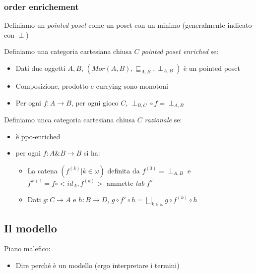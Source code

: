 \documentclass{beamer}
\begin{document}
\begin{frame}
	
	\frametitle{order enrichement}
	
	Definiamo un \emph{pointed poset} come un poset con un minimo (generalmente indicato con $\perp$)
	
	Definiamo una categoria cartesiana chiusa $C$ \emph{pointed poset enriched} se:
	\begin{itemize}
		\item Dati due oggetti $A,B$, $(Mor(A,B),\sqsubseteq _{A,B},\perp _{A,B})$ è un pointed poset
		\item Composizione, prodotto e currying sono monotoni
		\item Per ogni $f: A\rightarrow B$, per ogni gioco $C$, $\perp_{B,C} \circ f = \perp _{A,B}$
	\end{itemize}
	
	Definiamo unca categoria cartesiana chiusa $C$ \emph{razionale} se:
	\begin{itemize}
		\item è ppo-enriched
		\item per ogni $f: A\& B \rightarrow B$ si ha:
		\begin{itemize}
			\item La catena $(f^{(k)} | k\in \omega)$ definita da $f^{(0)}=\perp _{A,B}$ e $f^{k+1} = f \circ <id_A , f^{(k)}>$ ammette \emph{lub} $f^{\triangledown}$
			\item Dati $g:C\rightarrow A$ e $h:B\rightarrow D$, $g\circ f^\triangledown \circ h = \bigsqcup_{k\in \omega} g \circ f^{(k)} \circ h$
		\end{itemize}

	\end{itemize}
	
\end{frame}




\subsection{Il modello}

\begin{frame}
	Piano malefico:
	\begin{itemize}
	\item Dire perché è un modello (ergo interpretare i termini)
	\end{itemize}
\end{frame}
\end{document}

